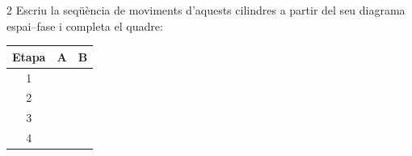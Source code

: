 \begin{exercici}{2}
Escriu la seqüència de moviments d'aquests cilindres a partir del seu diagrama espai--fase i completa el quadre:
\begin{center}
\qquad
\renewcommand{\arraystretch}{1.8}
\begin{tabular}{c|cc}
\textbf{Etapa} & \textbf{A} & \textbf{B}\\\hline
1 & \hspace{1cm} & \hspace{1cm}\\\hline 2 & & \\\hline 3 & & \\\hline 4 & & \\
\end{tabular}
\end{center}
\end{exercici}

\newcommand{\circuitC}{%
\begin{tikzpicture}[x=1cm,y=1cm]
 \pncyl{a}{1.5}{6.0}{d}
 \pnvalve{v}{1.0}{3.2}{52}{pilot}{pilot}
 \pnbutton{s1}{-2.2}{1.0}
 \pnvalve{s2}{5.2}{1.0}{32nc}{spring}{roll}
 \draw[pn] (v-4)--(2.17,5.0)--(1.75,5.0)--(a-A);
 \draw[pn] (v-2)--(2.53,4.6)--(3.85,4.6)--(a-B);
 \draw[pn] (s1-2)--(-.85,3.65)--(.58,3.65);
 \draw[pn] (s2-2)--(5.65,3.65)--(3.22,3.65);
 \draw[pn] (v-1)--(2.35,-.4);
 \draw[pn] (s1-1)--(-1.075,-.4) (s2-1)--(5.425,-.4) (-2.2,-.4)--(5.425,-.4);
 \draw[pn dash,-{Stealth}] (a-tija)--(7.2,6.35)--(7.2,1.6);
 \pnsource{-2.2}{-.4}{0}
 \pntag{-2.9}{-.4}{0Z1}\pntag{-1.9}{.45}{1S1}\pntag{6.1}{.45}{1S2}
 \pntag{.5}{2.75}{1V1}\pntag{4.9}{6.65}{1A1}
\end{tikzpicture}}


